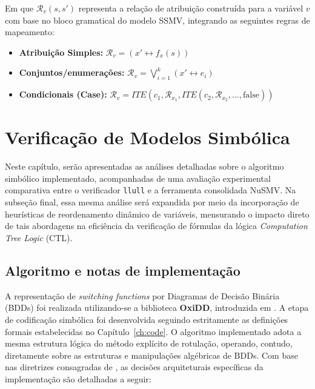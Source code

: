 \documentclass[cic,tc]{infufrgs}
\begin{document}
	Em que $\mathcal{R}_v(s,s')$ representa a relação de atribuição construída para a variável $v$ com base no bloco gramatical do modelo SSMV, integrando as seguintes regras de mapeamento:
	\begin{itemize}
		\item \textbf{Atribuição Simples:} $\mathcal{R}_v = (x' \leftrightarrow f_x(s))$
		\item \textbf{Conjuntos/enumerações:} $\mathcal{R}_v = \bigvee_{i=1}^k(x' \leftrightarrow e_i)$
		\item \textbf{Condicionais (Case):} $\mathcal{R}_v = ITE(c_1, \mathcal{R}_{x_1}, ITE(c_2, \mathcal{R}_{x_2}, \dots, \text{false}))$
	\end{itemize}
	
	\chapter{Verificação de Modelos Simbólica}
	\label{ch:ver_simbolica}
	
	Neste capítulo, serão apresentadas as análises detalhadas sobre o algoritmo simbólico implementado, acompanhadas de uma avaliação experimental comparativa entre o verificador \texttt{llull} e a ferramenta consolidada NuSMV. Na subseção final, essa mesma análise será expandida por meio da incorporação de heurísticas de reordenamento dinâmico de variáveis, mensurando o impacto direto de tais abordagens na eficiência da verificação de fórmulas da lógica \textit{Computation Tree Logic} (CTL).
	
	\section{Algoritmo e notas de implementação}
	\label{sec:algoritmo_notas_simbolica}
	
	A representação de \textit{switching functions} por Diagramas de Decisão Binária (BDDs) foi realizada utilizando-se a biblioteca \textbf{OxiDD}, introduzida em . A etapa de codificação simbólica foi desenvolvida seguindo estritamente as definições formais estabelecidas no Capítulo~\ref{ch:code}. O algoritmo implementado adota a mesma estrutura lógica do método explícito de rotulação, operando, contudo, diretamente sobre as estruturas e manipulações algébricas de BDDs. Com base nas diretrizes consagradas de , as decisões arquiteturais específicas da implementação são detalhadas a seguir:
	
\end{document}
